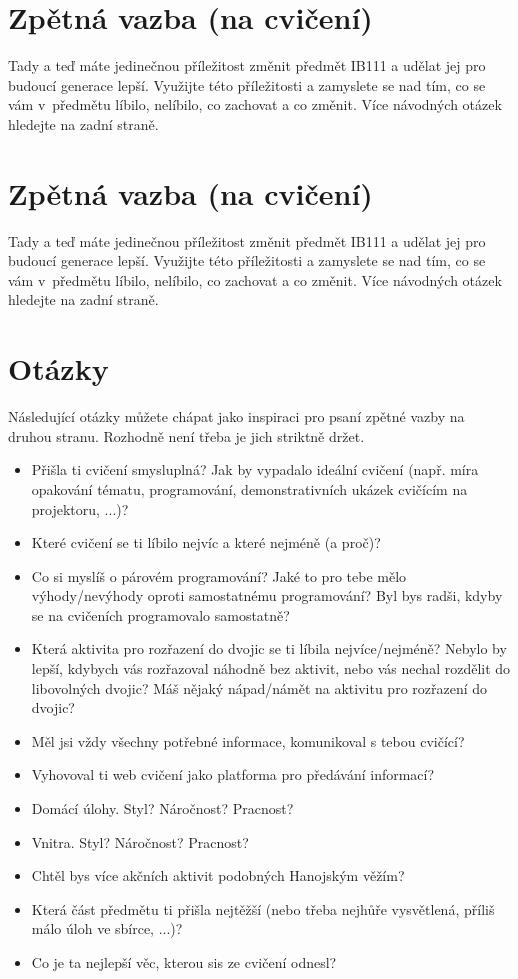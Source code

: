 \documentclass[12pt,a5paper]{article}
\begin{document}
\pagestyle{empty}

\section*{Zpětná vazba (na cvičení)}
Tady a teď máte jedinečnou příležitost změnit předmět IB111 a udělat jej pro
budoucí generace lepší. Využijte této příležitosti a zamyslete se nad tím, co
se vám v~předmětu líbilo, nelíbilo, co zachovat a co změnit. Více návodných
otázek hledejte na zadní straně.

\newpage

\section*{Zpětná vazba (na cvičení)}
Tady a teď máte jedinečnou příležitost změnit předmět IB111 a udělat jej pro
budoucí generace lepší. Využijte této příležitosti a zamyslete se nad tím, co
se vám v~předmětu líbilo, nelíbilo, co zachovat a co změnit. Více návodných
otázek hledejte na zadní straně.

\newpage

\section*{Otázky}

Následující otázky můžete chápat jako inspiraci pro psaní zpětné vazby na
druhou stranu. Rozhodně není třeba je jich striktně držet.

\begin{itemize}
	\item Přišla ti cvičení smysluplná? Jak by vypadalo ideální
		  cvičení (např. míra opakování tématu, programování, demonstrativních
		  ukázek cvičícím na projektoru, ...)?
	\item Které cvičení se ti líbilo nejvíc a které nejméně (a proč)?
	\item Co si myslíš o párovém programování? Jaké to pro tebe mělo
		  výhody/nevýhody oproti samostatnému programování? Byl bys radši,
		  kdyby se na cvičeních programovalo samostatně?
	\item Která aktivita pro rozřazení do dvojic se ti líbila nejvíce/nejméně?
		  Nebylo by lepší, kdybych vás rozřazoval náhodně bez aktivit, nebo vás
		  nechal rozdělit do libovolných dvojic? Máš nějaký nápad/námět na
		  aktivitu pro rozřazení do dvojic?
	\item Měl jsi vždy všechny potřebné informace, komunikoval s tebou cvičící?
	\item Vyhovoval ti web cvičení jako platforma pro předávání informací?
	\item Domácí úlohy. Styl? Náročnost? Pracnost?
	\item Vnitra. Styl? Náročnost? Pracnost?
	\item Chtěl bys více akčních aktivit podobných Hanojským věžím?
	\item Která část předmětu ti přišla nejtěžší (nebo třeba nejhůře
	      vysvětlená, příliš málo úloh ve sbírce, ...)?
	\item Co je ta nejlepší věc, kterou sis ze cvičení odnesl?
\end{itemize}
\end{document}
